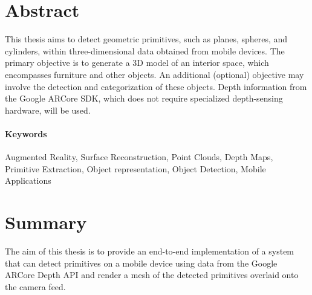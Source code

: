
\section*{Abstract}
This thesis aims to detect geometric primitives, such as planes, spheres, and cylinders,
within three-dimensional data obtained from mobile devices.
The primary objective is to generate a 3D model of an interior space, which encompasses furniture and other objects.
An additional (optional) objective may involve the detection and categorization of these objects.
Depth information from the Google ARCore SDK, which does not require specialized depth-sensing hardware, will be used.



\paragraph*{Keywords}
Augmented Reality, Surface Reconstruction, Point Clouds, Depth Maps, Primitive Extraction, Object representation, Object Detection, Mobile Applications

\section*{Summary}

The aim of this thesis is to provide an end-to-end implementation of a system
that can detect primitives on a mobile device using data from the Google ARCore Depth API
and render a mesh of the detected primitives overlaid onto the camera feed.
